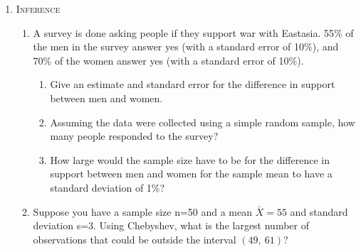 \documentclass[11pt,letterpaper]{article}
\numberwithin{equation}{section}
\begin{document}
\begin{enumerate}[I]
\begin{enumerate}[1)]
\end{enumerate}


\item \textsc{Inference} 

\begin{enumerate}[1)]

\item A survey is done asking people if they support war with Eastasia.  55\% of the men in the survey answer yes (with a standard error of 10\%), and 70\% of the women answer yes (with a standard error of 10\%).
\begin{enumerate}
\item[a)]  Give an estimate and standard error for the difference in support between men and women.
\item[b)]  Assuming the data were collected using a simple random sample, how many people responded to the survey?

\item[c)]  How large would the sample size have to be for the difference in support between men and women for the sample mean to have a standard deviation of 1\%?
\end{enumerate}
\item Suppose you have a sample size n=50 and a mean $\bar{X}=55$ and standard deviation s=3.  Using Chebyshev, what is the largest number of observations that could be outside the interval $(49,\ 61)$?



\end{enumerate}


\end{enumerate}
\end{document}
